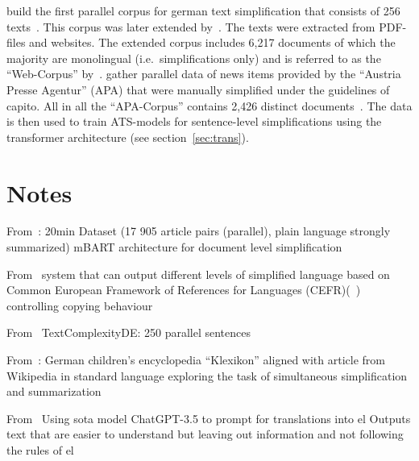 \autocite{klaper-etal-2013-building} build the first parallel corpus for german text simplification that consists of 256 texts~\autocite{ebeling2022}.
This corpus was later extended by~\autocite{battisti-etal-2020-corpus}.
The texts were extracted from PDF-files and websites.
The extended corpus includes 6,217 documents of which the majority are monolingual (i.e.\ simplifications only) and is referred to as the \enquote{Web-Corpus} by~\autocite{ebeling2022}.
\autocite{sauberli-etal-2020-benchmarking} gather parallel data of news items provided by the \enquote{Austria Presse Agentur} (APA) that were manually simplified under the guidelines of \gls{capito}.
All in all the \enquote{APA-Corpus} contains 2,426 distinct documents~\autocite{ebeling2022}.
The data is then used to train \gls{ATS}-models for sentence-level simplifications using the transformer architecture (see section~\ref{sec:trans}). %





\section{Notes}\label{sec:notes}


From~\autocite{rios-etal-2021-new}:
20min Dataset (17 905 article pairs (parallel), plain language strongly summarized)
mBART architecture for document level simplification

From~\autocite{spring-etal-2021-exploring}
system that can output different levels of simplified language based on
Common European Framework of References for Languages (CEFR)(~\autocite{Ansch_tz_2023})
controlling copying behaviour

From~\autocite{naderi2019subjective}
TextComplexityDE: 250 parallel sentences

From~\autocite{aumiller2022klexikon}:
German children’s encyclopedia \enquote{Klexikon} aligned with article from Wikipedia in standard language
exploring the task of simultaneous simplification and summarization

From~\autocite{deilen2023using}
Using sota model ChatGPT-3.5 to prompt for translations into \gls{el}
Outputs text that are easier to understand but leaving out information and not following the rules of \gls{el}

